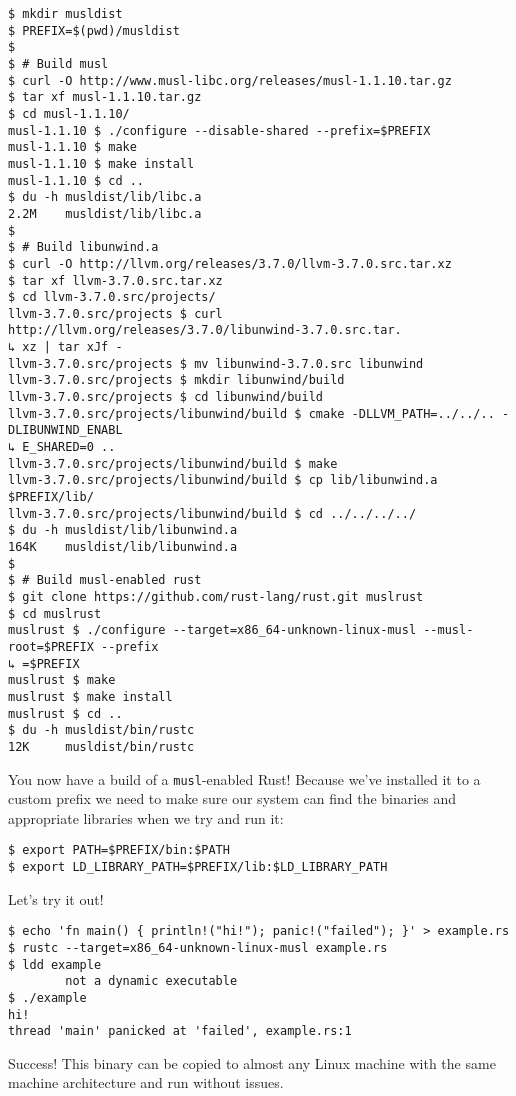 \documentclass[a4paper,]{book}
\begin{document}
\begin{verbatim}
$ mkdir musldist
$ PREFIX=$(pwd)/musldist
$
$ # Build musl
$ curl -O http://www.musl-libc.org/releases/musl-1.1.10.tar.gz
$ tar xf musl-1.1.10.tar.gz
$ cd musl-1.1.10/
musl-1.1.10 $ ./configure --disable-shared --prefix=$PREFIX
musl-1.1.10 $ make
musl-1.1.10 $ make install
musl-1.1.10 $ cd ..
$ du -h musldist/lib/libc.a
2.2M    musldist/lib/libc.a
$
$ # Build libunwind.a
$ curl -O http://llvm.org/releases/3.7.0/llvm-3.7.0.src.tar.xz
$ tar xf llvm-3.7.0.src.tar.xz
$ cd llvm-3.7.0.src/projects/
llvm-3.7.0.src/projects $ curl http://llvm.org/releases/3.7.0/libunwind-3.7.0.src.tar.
↳ xz | tar xJf -
llvm-3.7.0.src/projects $ mv libunwind-3.7.0.src libunwind
llvm-3.7.0.src/projects $ mkdir libunwind/build
llvm-3.7.0.src/projects $ cd libunwind/build
llvm-3.7.0.src/projects/libunwind/build $ cmake -DLLVM_PATH=../../.. -DLIBUNWIND_ENABL
↳ E_SHARED=0 ..
llvm-3.7.0.src/projects/libunwind/build $ make
llvm-3.7.0.src/projects/libunwind/build $ cp lib/libunwind.a $PREFIX/lib/
llvm-3.7.0.src/projects/libunwind/build $ cd ../../../../
$ du -h musldist/lib/libunwind.a
164K    musldist/lib/libunwind.a
$
$ # Build musl-enabled rust
$ git clone https://github.com/rust-lang/rust.git muslrust
$ cd muslrust
muslrust $ ./configure --target=x86_64-unknown-linux-musl --musl-root=$PREFIX --prefix
↳ =$PREFIX
muslrust $ make
muslrust $ make install
muslrust $ cd ..
$ du -h musldist/bin/rustc
12K     musldist/bin/rustc
\end{verbatim}

You now have a build of a \texttt{musl}-enabled Rust! Because we've
installed it to a custom prefix we need to make sure our system can find
the binaries and appropriate libraries when we try and run it:

\begin{verbatim}
$ export PATH=$PREFIX/bin:$PATH
$ export LD_LIBRARY_PATH=$PREFIX/lib:$LD_LIBRARY_PATH
\end{verbatim}

Let's try it out!

\begin{verbatim}
$ echo 'fn main() { println!("hi!"); panic!("failed"); }' > example.rs
$ rustc --target=x86_64-unknown-linux-musl example.rs
$ ldd example
        not a dynamic executable
$ ./example
hi!
thread 'main' panicked at 'failed', example.rs:1
\end{verbatim}

Success! This binary can be copied to almost any Linux machine with the
same machine architecture and run without issues.
\end{document}
